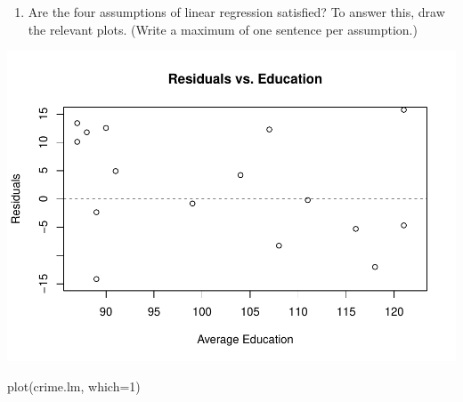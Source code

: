\documentclass[
]{article}
\newenvironment{Shaded}{\begin{snugshade}}{\end{snugshade}}
\newcommand{\AttributeTok}[1]{\textcolor[rgb]{0.77,0.63,0.00}{#1}}
\newcommand{\CommentTok}[1]{\textcolor[rgb]{0.56,0.35,0.01}{\textit{#1}}}
\newcommand{\DecValTok}[1]{\textcolor[rgb]{0.00,0.00,0.81}{#1}}
\newcommand{\FunctionTok}[1]{\textcolor[rgb]{0.00,0.00,0.00}{#1}}
\newcommand{\NormalTok}[1]{#1}
\newcommand{\SpecialCharTok}[1]{\textcolor[rgb]{0.00,0.00,0.00}{#1}}
\newcommand{\StringTok}[1]{\textcolor[rgb]{0.31,0.60,0.02}{#1}}
\providecommand{\tightlist}{%
  \setlength{\itemsep}{0pt}\setlength{\parskip}{0pt}}
\begin{document}
\begin{enumerate}
\def\labelenumi{\arabic{enumi}.}
\setcounter{enumi}{3}
\tightlist
\item
  Are the four assumptions of linear regression satisfied? To answer
  this, draw the relevant plots. (Write a maximum of one sentence per
  assumption.)
\end{enumerate}

\begin{Shaded}
\end{Shaded}

\includegraphics{Assignments_files/figure-latex/unnamed-chunk-33-1.pdf}

\begin{Shaded}
\begin{Highlighting}[]
\FunctionTok{plot}\NormalTok{(crime.lm, }\AttributeTok{which=}\DecValTok{1}\NormalTok{)}
\end{Highlighting}
\end{Shaded}
\end{document}
